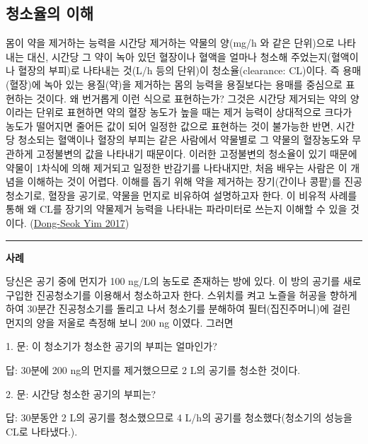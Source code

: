 \documentclass[
  11pt,
  krantz2, a4paper, twoside]{krantz}
\makeatletter
\newenvironment{kframe}{%
\medskip{}
\setlength{\fboxsep}{.8em}
 \def\at@end@of@kframe{}%
 \ifinner\ifhmode%
  \def\at@end@of@kframe{\end{minipage}}%
  \begin{minipage}{\columnwidth}%
 \fi\fi%
 \def\FrameCommand##1{\hskip\@totalleftmargin \hskip-\fboxsep
 \colorbox{shadecolor}{##1}\hskip-\fboxsep
     \hskip-\linewidth \hskip-\@totalleftmargin \hskip\columnwidth}%
 \MakeFramed {\advance\hsize-\width
   \@totalleftmargin\z@ \linewidth\hsize
   \@setminipage}}%
 {\par\unskip\endMakeFramed%
 \at@end@of@kframe}
\newenvironment{rmdblock}[1]
  {
  \begin{itemize}
  \renewcommand{\labelitemi}{
    \raisebox{-.7\height}[0pt][0pt]{
      {\setkeys{Gin}{width=3em,keepaspectratio}\texttt{[image: images/\#1]}}
    }
  }
  \setlength{\fboxsep}{1em}
  \begin{kframe}
  \item
  }
  {
  \end{kframe}
  \end{itemize}
  }
\newenvironment{rmdtip}
  {\begin{rmdblock}{tip}}
  {\end{rmdblock}}
\theoremstyle{definition}
\theoremstyle{definition}
\theoremstyle{definition}
\theoremstyle{definition}
\theoremstyle{remark}
\makeatother
\begin{document}
\hypertarget{uxccaduxc18cuxc728uxc758-uxc774uxd574}{%
\subsection{\texorpdfstring{청소율의 이해}{청소율의 이해}}\label{uxccaduxc18cuxc728uxc758-uxc774uxd574}}

몸이 약을 제거하는 능력을 시간당 제거하는 약물의 양(mg/h 와 같은 단위)으로 나타내는 대신, 시간당 그 약이 녹아 있던 혈장이나 혈액을 얼마나 청소해 주었는지(혈액이나 혈장의 부피)로 나타내는 것(L/h 등의 단위)이 청소율(clearance: CL)이다. 
즉 용매(혈장)에 녹아 있는 용질(약)을 제거하는 몸의 능력을 용질보다는 용매를 중심으로 표현하는 것이다.
왜 번거롭게 이런 식으로 표현하는가?
그것은 시간당 제거되는 약의 양이라는 단위로 표현하면 약의 혈장 농도가 높을 때는 제거 능력이 상대적으로 크다가 농도가 떨어지면 줄어든 값이 되어 일정한 값으로 표현하는 것이 불가능한 반면, 시간당 청소되는 혈액이나 혈장의 부피는 같은 사람에서 약물별로 그 약물의 혈장농도와 무관하게 고정불변의 값을 나타내기 때문이다.
이러한 고정불변의 청소율이 있기 때문에 약물이 1차식에 의해 제거되고 일정한 반감기를 나타내지만, 처음 배우는 사람은 이 개념을 이해하는 것이 어렵다. 
이해를 돕기 위해 약을 제거하는 장기(간이나 콩팥)를 진공청소기로, 혈장을 공기로, 약물을 먼지로 비유하여 설명하고자 한다.
이 비유적 사례를 통해 왜 CL를 장기의 약물제거 능력을 나타내는 파라미터로 쓰는지 이해할 수 있을 것이다. (\protect\hyperlink{ref-yim2017tutorial}{Dong-Seok Yim 2017})

\begin{center}\rule{0.5\linewidth}{0.5pt}\end{center}

\textbf{사례}

당신은 공기 중에 먼지가 100 ng/L의 농도로 존재하는 방에 있다. 이 방의 공기를 새로 구입한 진공청소기를 이용해서 청소하고자 한다.
스위치를 켜고 노즐을 허공을 향하게 하여 30분간 진공청소기를 돌리고 나서 청소기를 분해하여 필터(집진주머니)에 걸린 먼지의 양을 저울로 측정해 보니 200 ng 이였다.
그러면

\begin{rmdtip}
1. 문: 이 청소기가 청소한 공기의 부피는 얼마인가?

답: 30분에 200 ng의 먼지를 제거했으므로 2 L의 공기를 청소한 것이다.
\end{rmdtip}

\begin{rmdtip}
2. 문: 시간당 청소한 공기의 부피는?

답: 30분동안 2 L의 공기를 청소했으므로 4 L/h의 공기를 청소했다(청소기의 성능을 CL로 나타냈다.).
\end{rmdtip}
\end{document}
